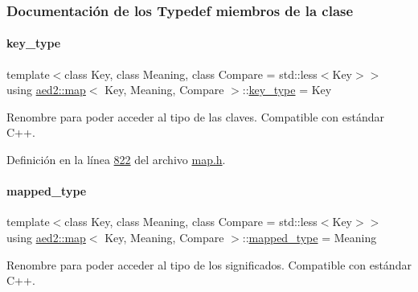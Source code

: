 \subsubsection{Documentación de los \textquotesingle{}Typedef\textquotesingle{} miembros de la clase}
\mbox{\label{classaed2_1_1map_a4273e8812e7105a618df58a2c8b72b7d_a4273e8812e7105a618df58a2c8b72b7d}} 
\paragraph{\texorpdfstring{key\+\_\+type}{key\_type}}
{\footnotesize\ttfamily template$<$class Key, class Meaning, class Compare = std\+::less$<$\+Key$>$$>$ \\
using \hyperlink{classaed2_1_1map}{aed2\+::map}$<$ Key, Meaning, Compare $>$\+::\hyperlink{classaed2_1_1map_a4273e8812e7105a618df58a2c8b72b7d_a4273e8812e7105a618df58a2c8b72b7d}{key\+\_\+type} =  Key}



Renombre para poder acceder al tipo de las claves. Compatible con estándar C++. 



Definición en la línea \hyperlink{map_8h_source_l00822}{822} del archivo \hyperlink{map_8h_source}{map.\+h}.

\mbox{\label{classaed2_1_1map_aa3e34bf624f3009884a71b18f4ddae40_aa3e34bf624f3009884a71b18f4ddae40}} 
\paragraph{\texorpdfstring{mapped\+\_\+type}{mapped\_type}}
{\footnotesize\ttfamily template$<$class Key, class Meaning, class Compare = std\+::less$<$\+Key$>$$>$ \\
using \hyperlink{classaed2_1_1map}{aed2\+::map}$<$ Key, Meaning, Compare $>$\+::\hyperlink{classaed2_1_1map_aa3e34bf624f3009884a71b18f4ddae40_aa3e34bf624f3009884a71b18f4ddae40}{mapped\+\_\+type} =  Meaning}



Renombre para poder acceder al tipo de los significados. Compatible con estándar C++. 



